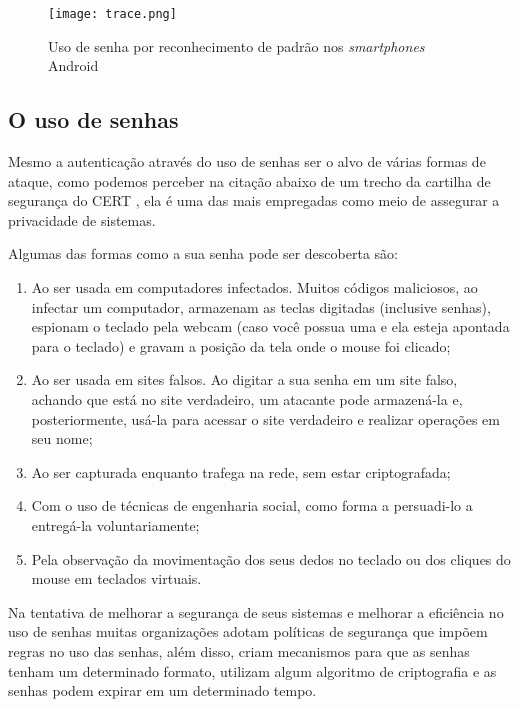 \begin{figure}[!htb]
	\centering
	\texttt{[image: trace.png]} %
	\small
	\caption[Uso de senha por reconhecimento de padrão]{Uso de senha por reconhecimento de padrão nos \textit{smartphones} Android}
	\label{fig:trace}
\end{figure}

\subsection{O uso de senhas}
Mesmo a autenticação através do uso de senhas ser o alvo de várias formas de ataque, como podemos perceber na citação abaixo de um trecho da cartilha de segurança do CERT \cite{Cert2016}, ela é uma das mais empregadas como meio de assegurar a privacidade de sistemas.
\begin{citacao}
Algumas das formas como a sua senha pode ser descoberta são:
	\begin{enumerate}
		\item Ao ser usada em computadores infectados. Muitos códigos maliciosos, ao infectar um computador, armazenam as teclas digitadas (inclusive senhas), espionam o teclado pela webcam (caso você possua uma e ela esteja apontada para o teclado) e gravam a posição da tela onde o mouse foi clicado;
		\item Ao ser usada em sites falsos. Ao digitar a sua senha em um site falso, achando que está no site verdadeiro, um atacante pode armazená-la e, posteriormente, usá-la para acessar o site verdadeiro e realizar operações em seu nome;
		\item Ao ser capturada enquanto trafega na rede, sem estar criptografada;
		\item Com o uso de técnicas de engenharia social, como forma a persuadi-lo a entregá-la voluntariamente;
		\item Pela observação da movimentação dos seus dedos no teclado ou dos cliques do mouse em teclados virtuais.
	\end{enumerate}
\end{citacao}

Na tentativa de melhorar a segurança de seus sistemas e melhorar a eficiência no uso de senhas muitas organizações adotam políticas de segurança que impõem regras no uso das senhas, além disso, criam mecanismos para que as senhas tenham um determinado formato, utilizam algum algoritmo de criptografia e as senhas podem expirar em um determinado tempo.

